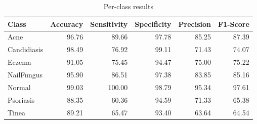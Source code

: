 \begin{table}
\caption{Per-class results}
\label{tab:results}
\begin{tabular}{lrrrrr}
\toprule
Class & Accuracy & Sensitivity & Specificity & Precision & F1-Score \\
\midrule
Acne & 96.76 & 89.66 & 97.78 & 85.25 & 87.39 \\
Candidiasis & 98.49 & 76.92 & 99.11 & 71.43 & 74.07 \\
Eczema & 91.05 & 75.45 & 94.47 & 75.00 & 75.22 \\
NailFungus & 95.90 & 86.51 & 97.38 & 83.85 & 85.16 \\
Normal & 99.03 & 100.00 & 98.79 & 95.34 & 97.61 \\
Psoriasis & 88.35 & 60.36 & 94.59 & 71.33 & 65.38 \\
Tinea & 89.21 & 65.47 & 93.40 & 63.64 & 64.54 \\
\bottomrule
\end{tabular}
\end{table}
